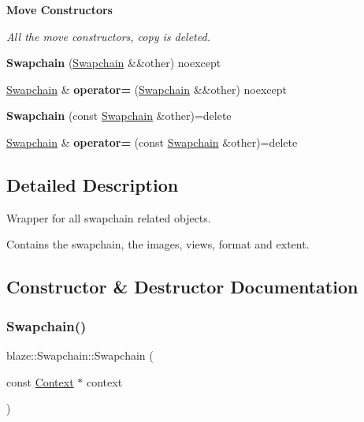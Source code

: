 \begin{Indent}\textbf{ Move Constructors}\par
{\em All the move constructors, copy is deleted. }\begin{DoxyCompactItemize}
\item 
\mbox{\label{classblaze_1_1Swapchain_a7fb4cafc77a13f8f528f36cd1bfdef8e}} 
{\bfseries Swapchain} (\hyperlink{classblaze_1_1Swapchain}{Swapchain} \&\&other) noexcept
\item 
\mbox{\label{classblaze_1_1Swapchain_a905a406ed42dba71fabfa376c91b093e}} 
\hyperlink{classblaze_1_1Swapchain}{Swapchain} \& {\bfseries operator=} (\hyperlink{classblaze_1_1Swapchain}{Swapchain} \&\&other) noexcept
\item 
\mbox{\label{classblaze_1_1Swapchain_adc9e4978a3d87beade9512d2adc60ffc}} 
{\bfseries Swapchain} (const \hyperlink{classblaze_1_1Swapchain}{Swapchain} \&other)=delete
\item 
\mbox{\label{classblaze_1_1Swapchain_a9502036a56c1dd2ca10e5fe273490986}} 
\hyperlink{classblaze_1_1Swapchain}{Swapchain} \& {\bfseries operator=} (const \hyperlink{classblaze_1_1Swapchain}{Swapchain} \&other)=delete
\end{DoxyCompactItemize}
\end{Indent}


\subsection{Detailed Description}
Wrapper for all swapchain related objects. 

Contains the swapchain, the images, views, format and extent. 

\subsection{Constructor \& Destructor Documentation}
\mbox{\label{classblaze_1_1Swapchain_a92cae631c3a1b925686a1836a3b15e09}} 
\subsubsection{\texorpdfstring{Swapchain()}{Swapchain()}}
{\footnotesize\ttfamily blaze\+::\+Swapchain\+::\+Swapchain (\begin{DoxyParamCaption}\item[{const \hyperlink{classblaze_1_1Context}{Context} $\ast$}]{context }\end{DoxyParamCaption})\hspace{0.3cm}{\ttfamily [noexcept]}}



